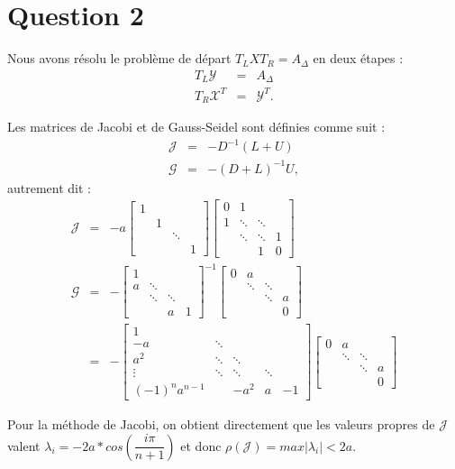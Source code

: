 \section{Question 2}
Nous avons résolu le problème de départ $T_L X T_R = A_{\Delta}$ en deux étapes : 
\begin{eqnarray}\label{eq_q2}
T_L \mathcal{Y} &=& A_{\Delta}\\
T_R \mathcal{X}^T &=& \mathcal{Y}^T.
\end{eqnarray}

Les matrices de Jacobi et de Gauss-Seidel sont définies comme suit : 
\begin{eqnarray}
\mathcal{J} &=& -D^{-1}(L+U)\\
\mathcal{G} &=& -(D+L)^{-1}U,
\end{eqnarray}
autrement dit :
\begin{eqnarray}
\mathcal{J} &=& - a
\left[ 
\begin{array}{cccc}
1 & & &\\
 & 1 & &\\
 & & \ddots & \\
  & & & 1
\end{array} 
\right] 
\left[ 
\begin{array}{cccc}
0 & 1& &\\
1 & \ddots & \ddots &\\
 & \ddots & \ddots & 1 \\
  & & 1 & 0
\end{array} 
\right]\\
\mathcal{G} & = & -  
\left[ 
\begin{array}{cccc}
1 & & &\\
a & \ddots &  &\\
 & \ddots & \ddots  &  \\
  & & a & 1
\end{array} 
\right] ^{-1}
\left[ 
\begin{array}{cccc}
0 & a & &\\
 & \ddots &  \ddots &\\
 &  & \ddots  & a \\
  & &  & 0
\end{array} 
\right] 
\\
&=& -
\left[ 
\begin{array}{ccccc}
1 & & & &\\
-a & \ddots &  & &\\
a^2 & \ddots & \ddots  &  &\\
 \vdots & \ddots & \ddots & \ddots & \\
(-1)^{n}a^{n-1} & & -a^2 & a & -1
\end{array} 
\right]
\left[ 
\begin{array}{cccc}
0 & a & &\\
 & \ddots &  \ddots &\\
 &  & \ddots  & a \\
  & &  & 0
\end{array} 
\right]
\end{eqnarray}

Pour la méthode de Jacobi, on obtient directement que les valeurs propres de $\mathcal{J}$ valent $\lambda _i = -2a * cos(\dfrac{i \pi}{n+1})$ et donc $\rho(\mathcal{J}) = max |\lambda _i| < 2a$. 

